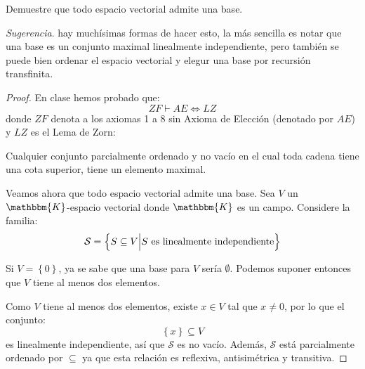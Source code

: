 \documentclass[12pt]{article}
\newcounter{it}
\theoremstyle{largebreak}
\newcommand{\bbm}[1]{\mathbbm{#1}}
\begin{document}
    \begin{excer}
        Demuestre que todo espacio vectorial admite una base.

        \textit{Sugerencia}. hay muchísimas formas de hacer esto, la más sencilla es notar que una base es un conjunto maximal linealmente independiente, pero también se puede bien ordenar el espacio vectorial y elegur una base por recursión transfinita.
    \end{excer}

    \begin{proof}
        En clase hemos probado que:
        \begin{equation*}
            ZF\vdash AE\iff LZ
        \end{equation*}
        donde $ZF$ denota a los axiomas 1 a 8 sin Axioma de Elección (denotado por $AE$) y $LZ$ es el Lema de Zorn:

        \begin{theor}
            Cualquier conjunto parcialmente ordenado y no vacío en el cual toda cadena tiene una cota superior, tiene un elemento maximal.
        \end{theor}

        Veamos ahora que todo espacio vectorial admite una base. Sea $V$ un $\bbm{K}$-espacio vectorial donde $\bbm{K}$ es un campo. Considere la familia:
        \begin{equation*}
            \mathcal{S}=\left\{S\subseteq V\Big|S\textup{ es linealmente independiente}\right\}
        \end{equation*}

        Si $V=\left\{0\right\}$, ya se sabe que una base para $V$ sería $\emptyset$. Podemos suponer entonces que $V$ tiene al menos dos elementos.

        Como $V$ tiene al menos dos elementos, existe $x\in V$ tal que $x\neq 0$, por lo que el conjunto:
        \begin{equation*}
            \left\{x\right\}\subseteq V
        \end{equation*}
        es linealmente independiente, así que $\mathcal{S}$ es no vacío. Además, $\mathcal{S}$ está parcialmente ordenado por $\subseteq$ ya que esta relación es reflexiva, antisimétrica y transitiva.


\end{proof}
\end{document}
